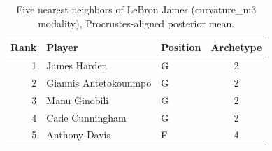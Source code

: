 \begin{table}[htbp]
  \centering\small
  \begin{tabular}{rllc}
    \toprule
    Rank & Player & Position & Archetype \\
    \midrule
    1 & James Harden & G & 2 \\
    2 & Giannis Antetokounmpo & G & 2 \\
    3 & Manu Ginobili & G & 2 \\
    4 & Cade Cunningham & G & 2 \\
    5 & Anthony Davis & F & 4 \\
    \bottomrule
  \end{tabular}
  \caption{Five nearest neighbors of LeBron James (curvature_m3 modality), Procrustes-aligned posterior mean.}
  \label{tab:LeBron_James_neighbors_curvature_m3}
\end{table}

